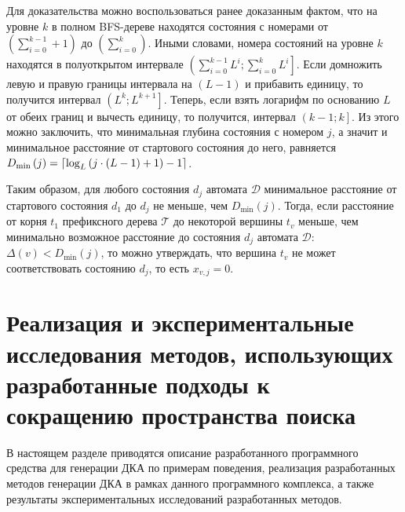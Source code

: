 Для доказательства можно воспользоваться ранее доказанным фактом, что на уровне $k$ в полном BFS-дереве находятся состояния с номерами от $\left(\sum_{i = 0}^{k - 1} + 1\right)$ до $\left(\sum_{i = 0}^{k}\right)$.
Иными словами, номера состояний на уровне $k$ находятся в полуоткрытом интервале $\left(\sum_{i = 0}^{k - 1}L^{i};\sum_{i = 0}^{k}L^{i}\right]$.
Если домножить левую и правую границы интервала на $(L - 1)$ и прибавить единицу, то получится интервал $\left(L^{k};L^{k + 1}\right]$.
Теперь, если взять логарифм по основанию $L$ от обеих границ и вычесть единицу, то получится, интервал $\left(k - 1; k\right]$.
Из этого можно заключить, что минимальная глубина состояния с номером $j$, а значит и минимальное расстояние от стартового состояния до него, равняется $D_{\min}\left(j\right) = \ceil*{\log_{L}\left(j \cdot \left(L - 1\right) + 1\right) - 1}$.

Таким образом, для любого состояния $d_{j}$ автомата $\mathcal{D}$ минимальное расстояние от стартового состояния $d_{1}$ до $d_{j}$ не меньше, чем $D_{\min}\left(j\right)$. 
Тогда, если расстояние от корня $t_{1}$ префиксного дерева $\mathcal{T}$ до некоторой вершины $t_{v}$ меньше, чем минимально возможное расстояние до состояния $d_{j}$ автомата $\mathcal{D}$: $\Delta\left(v\right) < D_{\min}\left(j\right)$, то можно утверждать, что вершина $t_{v}$ не может соответствовать состоянию $d_{j}$, то есть $x_{v,j} = 0$.





\section{Реализация и экспериментальные исследования методов, использующих разработанные подходы к сокращению пространства поиска}
\label{sec:space:results}

В настоящем разделе приводятся описание разработанного программного средства для генерации ДКА по примерам поведения, реализация разработанных методов генерации ДКА в рамках данного программного комплекса, а также результаты экспериментальных исследований разработанных методов.

